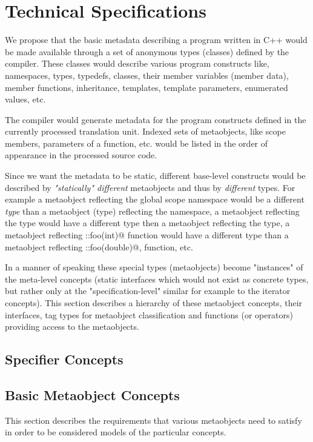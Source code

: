 \section{Technical Specifications}

We propose that the basic metadata describing a program written
in C++ would be made available through a set of anonymous types (classes)
defined by the compiler. These classes would describe various program
constructs like, namespaces, types, typedefs, classes, their member variables
(member data), member functions, inheritance, templates, template parameters,
enumerated values, etc.

The compiler would generate metadata for the program constructs defined
in the currently processed translation unit. Indexed sets of metaobjects,
like scope members, parameters of a function, etc. would be listed
in the order of appearance in the processed source code.

Since we want the metadata to be static, different base-level constructs
would be described by {\em "statically" different} metaobjects and thus
by {\em different} types.
For example a metaobject reflecting the global scope namespace would
be a different {\em type} than a metaobject (type) reflecting the \verb@std@
namespace, a metaobject reflecting the \verb@int@ type would
have a different type then a metaobject reflecting the \verb@double@
type, a metaobject reflecting \verb@::foo(int)@ function would
have a different type than a metaobject reflecting \verb@::foo(double)@,
function, etc.

In a manner of speaking these special types (metaobjects) become
"instances" of the meta-level concepts (static interfaces which
would not exist as concrete types, but rather only at the
"specification-level" similar for example to the iterator concepts).
This section describes a hierarchy of these metaobject concepts,
their interfaces, tag types for metaobject classification and
functions (or operators) providing access to the metaobjects.

\subsection{Specifier Concepts}

\subsection{Basic Metaobject Concepts}

This section describes the requirements that various metaobjects
need to satisfy in order to be considered models of the particular
concepts.

